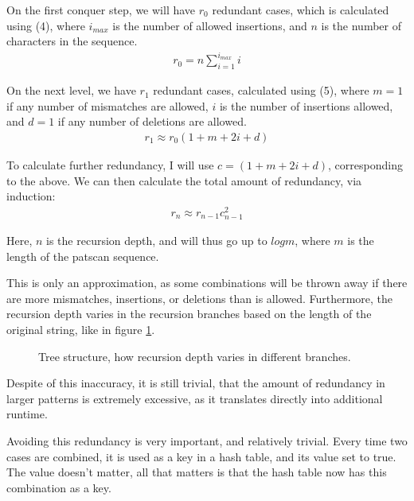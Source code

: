 \documentclass[12pt]{article}
\theoremstyle{definition}
\begin{document}
On the first conquer step, we will have $r_0$ redundant cases, which is calculated using (4), where $i_{max}$ is the number of allowed insertions, and $n$ is the number of characters in the sequence.
\begin{eqnarray}
	r_0 = n\sum^{i_{max}}_{i=1} i
\end{eqnarray}

On the next level, we have $r_1$ redundant cases, calculated using (5), where $m=1$ if any number of mismatches are allowed, $i$ is the number of insertions allowed, and $d=1$ if any number of deletions are allowed.
\begin{eqnarray}
	r_1 \approx r_0(1 + m + 2i + d)
\end{eqnarray}

To calculate further redundancy, I will use $c = (1 + m + 2i + d)$, corresponding to the above. We can then calculate the total amount of redundancy, via induction:
\begin{eqnarray}
	r_n \approx r_{n-1}c_{n-1}^2
\end{eqnarray}

Here, $n$ is the recursion depth, and will thus go up to $logm$, where $m$ is the length of the patscan sequence.

This is only an approximation, as some combinations will be thrown away if there are more mismatches, insertions, or deletions than is allowed. Furthermore, the recursion depth varies in the recursion branches based on the length of the original string, like in figure \ref{fig:recursion_depth_example}.

\begin{figure}[H]
	\centering
	\caption{Tree structure, how recursion depth varies in different branches.}
	\label{fig:recursion_depth_example}
\end{figure}

Despite of this inaccuracy, it is still trivial, that the amount of redundancy in larger patterns is extremely excessive, as it translates directly into additional runtime.

Avoiding this redundancy is very important, and relatively trivial. Every time two cases are combined, it is used as a key in a hash table, and its value set to true. The value doesn't matter, all that matters is that the hash table now has this combination as a key.
\end{document}
